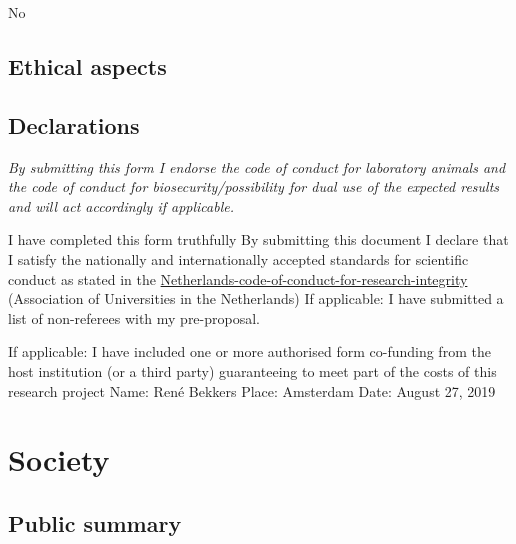\documentclass[twocolumn, serif, rga, numeric]{jote-article}
\begin{document}
No 
 {}\subsection*{Ethical aspects} 


 {}\subsection*{Declarations} 

\emph{By submitting this form I endorse the code of conduct for laboratory animals and the code of conduct for biosecurity/possibility for dual use of the expected results and will act accordingly if applicable.}

 I have completed this form truthfully 
 By submitting this document I declare that I satisfy the nationally and internationally accepted standards for scientific conduct as stated in the \href{https://www.nwo.nl/en/news-and-events/news/2018/09/new-netherlands-code-of-conduct-for-research-integrity.html}{Netherlands-code-of-conduct-for-research-integrity}
(Association of Universities in the Netherlands) 
 If applicable: I have submitted a list of non-referees with my pre-proposal.

If applicable: I have included one or more authorised form co-funding from the host institution (or a third party) guaranteeing to meet part of the costs of this research project 
Name: Ren\'e Bekkers 
Place: Amsterdam 
Date: August 27, 2019 
 {}\section*{Society} 

 {}\subsection*{Public summary} 
\end{document}

